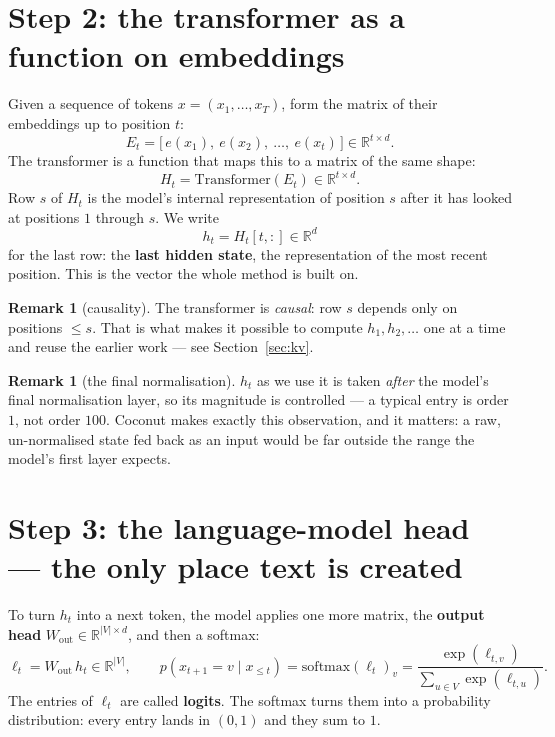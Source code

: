\documentclass[11pt]{article}
\theoremstyle{definition}
\newtheorem{remark}[theorem]{Remark}
\begin{document}
\begin{center}
\end{center}

\section{Step 2: the transformer as a function on embeddings}

Given a sequence of tokens $x = (x_1,\dots,x_T)$, form the matrix of their embeddings up to position $t$:
\[
E_t = \big[\,e(x_1),\ e(x_2),\ \dots,\ e(x_t)\,\big] \in \mathbb{R}^{t\times d}.
\]
The transformer is a function that maps this to a matrix of the same shape:
\[
H_t = \mathrm{Transformer}(E_t) \in \mathbb{R}^{t \times d}.
\tag{2.1}
\]
Row $s$ of $H_t$ is the model's internal representation of position $s$ after it has looked at positions $1$ through $s$. We write
\[
h_t = H_t[t,:] \in \mathbb{R}^{d}
\]
for the last row: the \textbf{last hidden state}, the representation of the most recent position. This is the vector the whole method is built on.

\begin{remark}[causality]
The transformer is \emph{causal}: row $s$ depends only on positions $\le s$. That is what makes it possible to compute $h_1, h_2, \dots$ one at a time and reuse the earlier work --- see Section~\ref{sec:kv}.
\end{remark}

\begin{remark}[the final normalisation]
$h_t$ as we use it is taken \emph{after} the model's final normalisation layer, so its magnitude is controlled --- a typical entry is order $1$, not order $100$. Coconut makes exactly this observation, and it matters: a raw, un-normalised state fed back as an input would be far outside the range the model's first layer expects.
\end{remark}

\section{Step 3: the language-model head --- the only place text is created}

To turn $h_t$ into a next token, the model applies one more matrix, the \textbf{output head} $W_{\mathrm{out}} \in \mathbb{R}^{|V|\times d}$, and then a softmax:
\[
\ell_t = W_{\mathrm{out}}\, h_t \in \mathbb{R}^{|V|},
\qquad
p(x_{t+1} = v \mid x_{\le t}) = \mathrm{softmax}(\ell_t)_v
= \frac{\exp(\ell_{t,v})}{\sum_{u \in V}\exp(\ell_{t,u})}.
\tag{2.2}
\]
The entries of $\ell_t$ are called \textbf{logits}. The softmax turns them into a probability distribution: every entry lands in $(0,1)$ and they sum to $1$.
\end{document}
